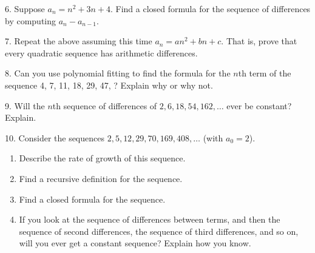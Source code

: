 \documentclass[12pt,]{book}
\theoremstyle{plain}
\theoremstyle{definition}
\theoremstyle{definition}
\theoremstyle{definition}
\numberwithin{equation}{chapter}
\begin{document}
\begin{exerciselist}
\begin{enumerate}[label=(\alph*)]
\end{enumerate}
%
\par\smallskip
\item[6.]\hypertarget{exercise-28}{}\hypertarget{p-272}{}%
Suppose \(a_n = n^2 + 3n + 4\). Find a closed formula for the sequence of differences by computing \(a_n - a_{n-1}\).%
\par\smallskip
\item[7.]\hypertarget{exercise-29}{}\hypertarget{p-274}{}%
Repeat the above assuming this time \(a_n = an^2 + bn + c\). That is, prove that every quadratic sequence has arithmetic differences.%
\par\smallskip
\item[8.]\hypertarget{exercise-30}{}\hypertarget{p-275}{}%
Can you use polynomial fitting to find the formula for the \(n\)th term of the sequence 4, 7, 11, 18, 29, 47, \textellipsis{}? Explain why or why not.%
\par\smallskip
\item[9.]\hypertarget{exercise-31}{}\hypertarget{p-276}{}%
Will the \(n\)th sequence of differences of \(2, 6, 18, 54, 162, \ldots\) ever be constant? Explain.%
\par\smallskip
\item[10.]\hypertarget{exercise-32}{}\hypertarget{p-277}{}%
Consider the sequences \(2, 5, 12, 29, 70, 169, 408,\ldots\) (with \(a_0 = 2\)).%
\par
\hypertarget{p-278}{}%
\leavevmode%
\begin{enumerate}[label=(\alph*)]
\item\hypertarget{li-173}{}\hypertarget{p-279}{}%
Describe the rate of growth of this sequence. %
\item\hypertarget{li-174}{}\hypertarget{p-280}{}%
Find a recursive definition for the sequence. %
\item\hypertarget{li-175}{}\hypertarget{p-281}{}%
Find a closed formula for the sequence. %
\item\hypertarget{li-176}{}\hypertarget{p-282}{}%
If you look at the sequence of differences between terms, and then the sequence of second differences, the sequence of third differences, and so on, will you ever get a constant sequence? Explain how you know. %
\end{enumerate}
%
\par\smallskip
\end{exerciselist}
\typeout{************************************************}
\typeout{************************************************}
\end{document}
